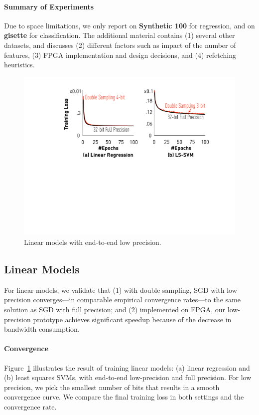 \documentclass{article}
\begin{document}
\paragraph*{Summary of Experiments}
Due to space limitations, we only report on {\bf Synthetic 100} for regression, and on 
{\bf gisette} for classification. 
The additional material contains (1) several other datasets, 
and discusses (2) different
factors such as impact of the number of features, 
(3) FPGA implementation and design
decisions, and (4) refetching heuristics.


\begin{figure}[t]
\centering
\includegraphics[width=0.8\columnwidth]{final-experiments/linearmodel} 
\caption{Linear models with end-to-end low precision.}
\label{fig:convergence}
\end{figure}

\subsection{Linear Models}

For linear models, we validate that (1) 
with double sampling, SGD with low
precision converges---in
comparable empirical 
convergence rates---to the same solution
as SGD with full precision; and
(2) implemented on FPGA, our low-precision
prototype achieves significant speedup
because of the decrease in bandwidth
consumption.

\paragraph{Convergence}

Figure~\ref{fig:convergence} illustrates
the result of training linear models:
(a) linear
regression and (b) least squares SVMs,
with end-to-end low-precision and 
full precision. For
low precision, we pick the 
smallest number of bits that
results in a smooth convergence
curve. We compare the final 
training loss in both settings 
and the convergence rate.
\end{document}

